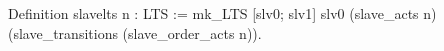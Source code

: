 Definition slavelts n : LTS := 
 mk_LTS [slv0; slv1] slv0 (slave_acts n) 
         (slave_transitions (slave_order_acts n)).